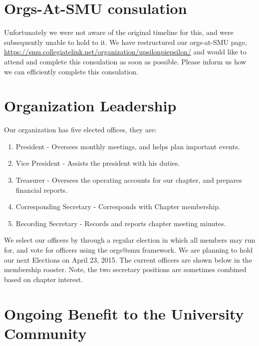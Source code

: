 \documentclass{article}
\begin{document}
\section{Orgs-At-SMU consulation}

    Unfortunately we were not aware of the original timeline for this, and were subsequently unable to hold to it. We have restructured our orgs-at-SMU page, \hyperref[https://smu.collegiatelink.net/organization/upsilonpiepsilon/]{https://smu.collegiatelink.net/organization/upsilonpiepsilon/} and would like to attend and complete this consulation as soon as possible. Please inform us how we can efficiently complete this consulation.

\section{Organization Leadership}

    Our organization has five elected offices, they are: 
        \begin{enumerate}
        \item President - Oversees monthly meetings, and helps plan important events. 
        \item Vice President - Assists the president with his duties. 
        \item Treasurer - Oversees the operating accounts for our chapter, and prepares financial reports.
        \item Corresponding Secretary - Corresponds with Chapter membership.
        \item Recording Secretary - Records and reports chapter meeting minutes.
        \end{enumerate}
    We select our officers by through a regular election in which all members may run for, and vote for officers using the orgs@smu framework. We are planning to hold our next Elections on April 23, 2015. The current officers are shown below in the membership rooster. Note, the two secretary positions are sometimes combined based on chapter interest.

\section{Ongoing Benefit to the University Community}
\end{document}
